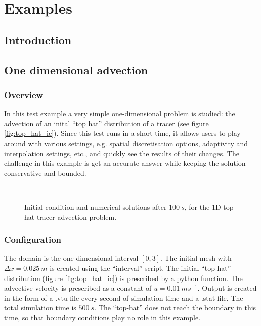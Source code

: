 \chapter{Examples}
\label{chap:examples}
\section{Introduction}
\label{sect:examples_introduction}


\section{One dimensional advection}
\label{sect:oned_advection}
\subsection{Overview}
In this test example a very simple one-dimensional problem is 
studied: the advection of an inital ``top hat'' distribution 
of a tracer (see figure \ref{fig:top_hat_ic}). Since this test runs in a  
short time, it allows users to play around with various
settings, e.g. spatial discretisation options, adaptivity 
and interpolation settings, etc., and quickly see the results
of their changes. The challenge in this example is get an accurate
answer while keeping the solution conservative and bounded.

\begin{figure}
  \centering
    \label{fig:top_hat_ic}
    \label{fig:top_hat_cg_example} \\
    \label{fig:top_hat_dg}
    \label{fig:top_hat_cv}
  \caption{Initial condition and numerical solutions after $100~s$, for the 1D top hat tracer advection problem.}
\end{figure}

\subsection{Configuration}
The domain is the one-dimensional interval $[0,3]$. The initial 
mesh with $\Delta x=0.025~m$ is created using the ``interval'' 
script. The initial ``top hat'' distribution (figure \ref{fig:top_hat_ic}) is 
prescribed by a python function. The advective velocity is 
prescribed as a constant of $u=0.01~ms^{-1}$. Output is created
in the form of a .vtu-file every second of simulation time
and a .stat file. The total simulation time is $500~s$. 
The ``top-hat'' does not reach the boundary in this time, so that
boundary conditions play no role in this example.

